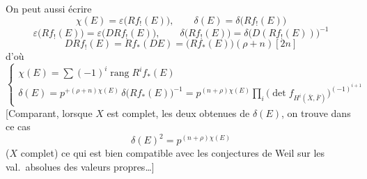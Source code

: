 \documentclass[11pt,a4paper]{article}
\begin{document}
On peut aussi écrire
\[
  \chi(E) = \varepsilon\bigl(R f_{!}(E)\bigr) , \qquad
  \delta(E) = \delta\bigl(R f_{!}(E)\bigr)
\]
\[
  \varepsilon\bigl(R f_{!}(E)\bigr) = \varepsilon\bigl(D R f_{!}(E)\bigr) ,\qquad
  \delta\bigl(R f_{!}(E)\bigr) = \delta\bigl(D(R f_{!}(E))\bigr)^{-1}
\]
\[
  D R f_{!}(E) = R f_{*}(DE) = \bigl(R f_{*}(E)\bigr)(\rho + n)[2n]
\]
d'où
\[
  \left\lbrace
  \begin{array}{l}
    \chi(E) = \sum (-1)^i \operatorname{rang} R^i f_{*}(E) \\[6pt]
    \delta(E) = p^{+(\rho+n)\chi(E)}\, \delta\bigl(R f_{*}(E)\bigr)^{-1}
      = p^{(n+\rho)\chi(E)} \prod_i \bigl(\det f_{H^i(\bar X, \bar F)}\bigr)^{(-1)^{i+1}}
  \end{array}
  \right.
\]
[Comparant, lorsque $X$ est complet, les deux  obtenues de
$\delta(E)$, on trouve dans ce cas
\[
  \delta(E)^2 = p^{(n+\rho)\chi(E)}
\]
($X$ complet)
ce qui est bien compatible avec les conjectures de Weil sur les
val.\ absolues des valeurs propres\ldots]
\end{document}
